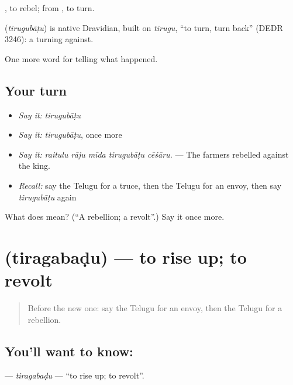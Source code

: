  , to rebel; from , to turn.

\begin{cousinweb}
\textbf{} (\emph{tirugubāṭu}) is native Dravidian, built on \emph{tirugu}, \textquotedblleft{}to turn, turn back\textquotedblright{} (DEDR 3246): a turning against.
\end{cousinweb}

\begin{grammarlens}[title={What you've built}]
One more word for telling what happened.
\end{grammarlens}

\subsection*{Your turn}
\begin{itemize}
\raggedright
  \item \emph{Say it:} \emph{tirugubāṭu}
  \item \emph{Say it:} \emph{tirugubāṭu}, once more
  \item \emph{Say it:} \emph{raitulu rāju mīda tirugubāṭu cēśāru.} — The farmers rebelled against the king.
  \item \emph{Recall:} say the Telugu for a truce, then the Telugu for an envoy, then say \emph{tirugubāṭu} again
\end{itemize}

\begin{tcolorbox}[breakable,colback=teal!4,colframe=teal!35!black,title={Before you move on}]
What does  mean? (\textquotedblleft{}A rebellion; a revolt\textquotedblright{}.) Say it once more.
\end{tcolorbox}
\section[\texorpdfstring{\te{తిరగబడు} (tiragabaḍu)}{తిరగబడు (tiragabaḍu)}]{ (tiragabaḍu) — to rise up; to revolt}

\label{lesson:TE-C363-tiragabadu}



\begin{quote}
Before the new one: say the Telugu for an envoy, then the Telugu for a rebellion.
\end{quote}

\subsection*{You'll want to know: }
\textbf{} — \emph{tiragabaḍu} — \textquotedblleft{}to rise up; to revolt\textquotedblright{}.

